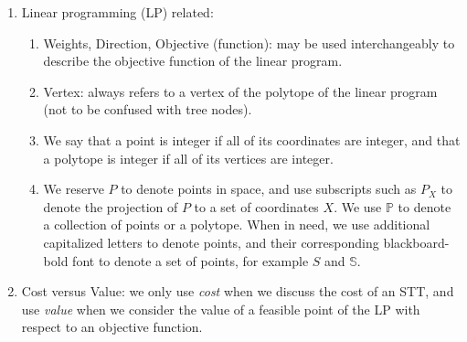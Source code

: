 \begin{definition}
\begin{enumerate}
    \item Linear programming (LP) related:
    \begin{enumerate}
        \item Weights, Direction, Objective (function): may be used interchangeably to describe the objective function of the linear program.
        \item Vertex: always refers to a vertex of the polytope of the linear program (not to be confused with tree nodes).
        \item We say that a point is integer if all of its coordinates are integer, and that a polytope is integer if all of its vertices are integer.

        \item We reserve $P$ to denote points in space, and use subscripts such as $P_X$ to denote the projection of $P$ to a set of coordinates $X$. We use $\mathbb{P}$ to denote a collection of points or a polytope. When in need, we use additional capitalized letters to denote points, and their corresponding blackboard-bold font to denote a set of points, for example $S$ and $\mathbb{S}$.
    \end{enumerate}

    \item Cost versus Value: we only use \emph{cost} when we discuss the cost of an STT, and use \emph{value} when we consider the value of a feasible point of the LP with respect to an objective function.
\end{enumerate}
\end{definition}

